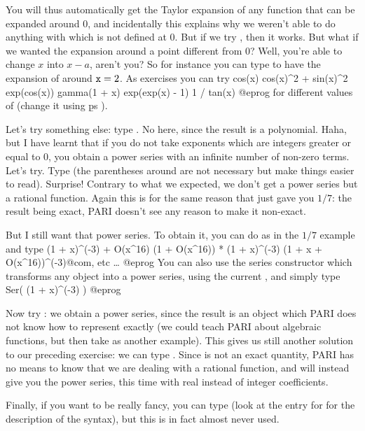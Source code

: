 You will thus automatically get the Taylor expansion of any function that can
be expanded around $0$, and incidentally this explains why we weren't
able to do anything with  which is not defined at 0. But if we
try , then it works. But what if we wanted the expansion
around a point different from 0? Well, you're able to change $x$ into
$x-a$, aren't you? So for instance you can type  to
have the expansion of  around ${\tt x}=2$. As exercises you can
try
\bprog
cos(x)           cos(x)^2 + sin(x)^2           exp(cos(x))
gamma(1 + x)     exp(exp(x) - 1)               1 / tan(x)
@eprog
\noindent for different values of  (change it using \b{ps}
).

Let's try something else: type . No  here, since
the result is a polynomial.  Haha, but I have learnt that if you do not take
exponents which are integers greater or equal to 0, you obtain a power series
with an infinite number of non-zero terms. Let's try.  Type
 (the parentheses around  are not necessary but
make things easier to read). Surprise! Contrary to what we expected, we don't
get a power series but a rational function. Again this is for the same reason
that  just gave you $1/7$: the result being exact, PARI doesn't see
any reason to make it non-exact.

But I still want that power series. To obtain it, you can do as in the $1/7$
example and type
\bprog
(1 + x)^(-3) + O(x^16)
(1 + O(x^16)) * (1 + x)^(-3)
(1 + x + O(x^16))^(-3)@com, etc \dots
@eprog
You can also use the series constructor which transforms any object into a
power series, using the current , and simply type
\bprog
Ser( (1 + x)^(-3) )
@eprog

Now try : we obtain a power series, since the
result is an object which PARI does not know how to represent exactly (we
could teach PARI about algebraic functions, but then take 
as another example). This gives us still another solution to our preceding
exercise: we can type . Since  is not an exact
quantity, PARI has no means to know that we are dealing with a rational
function, and will instead give you the power series, this time with real
instead of integer coefficients.

Finally, if you want to be really fancy, you can type
 (look at the entry for  for the
description of the syntax), but this is in fact almost never used.
\smallskip


